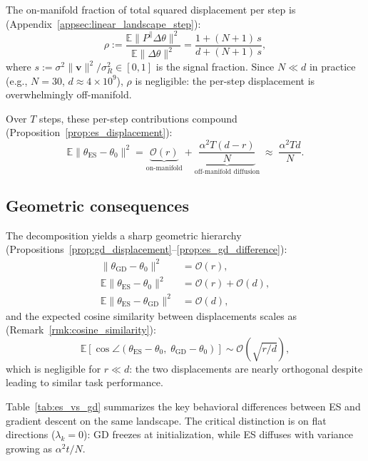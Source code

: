 The on-manifold fraction of total squared displacement per step is (Appendix~\ref{appsec:linear_landscape_step}):
\begin{equation}\label{eq:rho}
    \rho :=
    \frac{\mathbb{E}\|P^{\parallel}\Delta\theta\|^2}
         {\mathbb{E}\|\Delta\theta\|^2}
    =
    \frac{1 + (N{+}1)\,s}
         {d + (N{+}1)\,s},
\end{equation}
where $s := \sigma^{2}\|\mathbf{v}\|^{2}/\sigma_{R}^{2} \in [0,1]$ is the signal fraction. Since $N \ll d$ in practice (e.g., $N = 30$, $d \approx 4 \times 10^9$), $\rho$ is negligible: the per-step displacement is overwhelmingly off-manifold.

Over $T$ steps, these per-step contributions compound (Proposition~\ref{prop:es_displacement}):
\begin{equation}\label{eq:norm_hierarchy}
    \mathbb{E}\|\theta_{\mathrm{ES}} - \theta_0\|^2
    = \underbrace{\mathcal{O}(r)}_{\text{on-manifold}}
    + \underbrace{\frac{\alpha^2 T(d{-}r)}{N}}_{\text{off-manifold diffusion}}
    \;\approx\; \frac{\alpha^2 T d}{N}.
\end{equation}


\subsection{Geometric consequences}

The decomposition yields a sharp geometric hierarchy (Propositions~\ref{prop:gd_displacement}--\ref{prop:es_gd_difference}):
\begin{align}
    \|\theta_{\mathrm{GD}} - \theta_0\|^2 &= \mathcal{O}(r), \label{eq:gd_norm}\\
    \mathbb{E}\|\theta_{\mathrm{ES}} - \theta_0\|^2 &= \mathcal{O}(r) + \mathcal{O}(d), \label{eq:es_norm}\\
    \mathbb{E}\|\theta_{\mathrm{ES}} - \theta_{\mathrm{GD}}\|^2 &= \mathcal{O}(d), \label{eq:es_gd_norm}
\end{align}
and the expected cosine similarity between displacements scales as (Remark~\ref{rmk:cosine_similarity}):
\begin{equation}\label{eq:cosine}
    \mathbb{E}\!\left[\cos\angle(\theta_{\mathrm{ES}} - \theta_0,\;
    \theta_{\mathrm{GD}} - \theta_0)\right]
    \sim \mathcal{O}\!\left(\sqrt{r/d}\right),
\end{equation}
which is negligible for $r \ll d$: the two displacements are nearly orthogonal despite leading to similar task performance.

Table~\ref{tab:es_vs_gd} summarizes the key behavioral differences between ES and gradient descent on the same landscape. The critical distinction is on flat directions ($\lambda_k = 0$): GD freezes at initialization, while ES diffuses with variance growing as $\alpha^2 t / N$.

